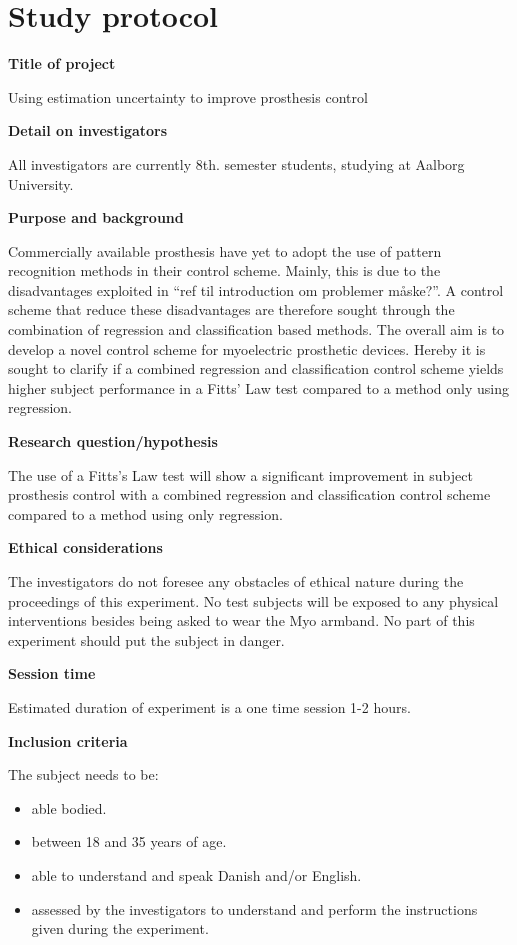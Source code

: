 \section{Study protocol}

\textbf{Title of project}

Using estimation uncertainty to improve prosthesis control 

\textbf{Detail on investigators}

All investigators are currently 8th. semester students, studying at Aalborg University.  

\textbf{Purpose and background}

Commercially available prosthesis have yet to adopt the use of pattern recognition methods in their control scheme. Mainly, this is due to the disadvantages exploited in “ref til introduction om problemer måske?”. A control scheme that reduce these disadvantages are therefore sought through the combination of regression and classification based methods. 
The overall aim is to develop a novel control scheme for myoelectric prosthetic devices. Hereby it is sought to clarify if a combined regression and classification control scheme yields higher subject performance in a Fitts’ Law test compared to a method only using regression.         

\textbf{Research question/hypothesis}

The use of a Fitts’s Law test will show a significant improvement in subject prosthesis control with a combined regression and classification control scheme compared to a method using only regression. 

\textbf{Ethical considerations}  

The investigators do not foresee any obstacles of ethical nature during the proceedings of this experiment. No test subjects will be exposed to any physical interventions besides being asked to wear the Myo armband. No part of this experiment should put the subject in danger. 

\textbf{Session time} 

Estimated duration of experiment is a one time session 1-2 hours. 

\textbf{Inclusion criteria}

The subject needs to be:
\begin{itemize}
	\item able bodied.
	\item between 18 and 35 years of age.
	\item able to understand and speak Danish and/or English.
	\item assessed by the investigators to understand and perform the instructions given during the experiment. 
\end{itemize}


